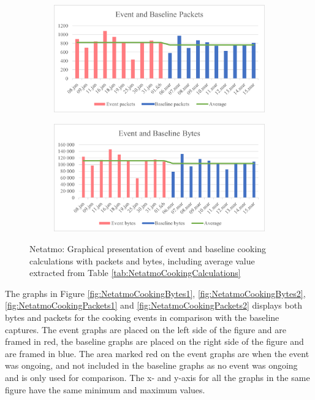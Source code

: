 \begin{figure}[H]
    \centering
    \begin{subfigure}{0.8\textwidth}
       \centering
       \includegraphics[width=1\hsize]{figures/Netatmo_Cooking_Calculations_Packets.png} 
    \end{subfigure}
    \begin{subfigure}{0.8\textwidth}
        \centering
        \includegraphics[width=1\hsize]{figures/Netatmo_Cooking_Calculations_Bytes.png} 
    \end{subfigure}
    \caption{Netatmo: Graphical presentation of event and baseline cooking calculations with packets and bytes, including average value extracted from Table \ref{tab:NetatmoCookingCalculations}}
    \label{fig:NetatmoCookingCalculations}
\end{figure}

The graphs in Figure \ref{fig:NetatmoCookingBytes1}, \ref{fig:NetatmoCookingBytes2}, \ref{fig:NetatmoCookingPackets1} and \ref{fig:NetatmoCookingPackets2} displays both bytes and packets for the cooking events in comparison with the baseline captures. The event graphs are placed on the left side of the figure and are framed in red, the baseline graphs are placed on the right side of the figure and are framed in blue. The area marked red on the event graphs are when the event was ongoing, and not included in the baseline graphs as no event was ongoing and is only used for comparison. The x- and y-axis for all the graphs in the same figure have the same minimum and maximum values. 

